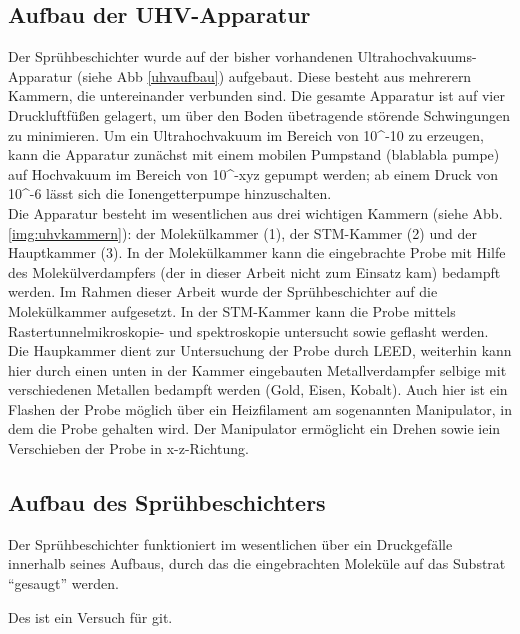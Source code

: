 \subsection{Aufbau der UHV-Apparatur}

Der Sprühbeschichter wurde auf der bisher vorhandenen Ultrahochvakuums-Apparatur (siehe Abb \ref{uhvaufbau})
aufgebaut.
Diese besteht aus mehrerern Kammern, die untereinander verbunden sind. Die gesamte Apparatur ist auf vier
Druckluftfüßen gelagert, um über den Boden übetragende störende Schwingungen zu minimieren. Um ein
Ultrahochvakuum im Bereich von 10^-10 zu erzeugen, kann die Apparatur zunächst mit einem mobilen Pumpstand 
(blablabla pumpe) auf Hochvakuum im Bereich von 10^-xyz gepumpt werden; ab einem Druck von 10^-6 lässt sich
die Ionengetterpumpe hinzuschalten.\\
Die Apparatur besteht im wesentlichen aus drei wichtigen Kammern (siehe Abb. \ref{img:uhvkammern}): der 
Molekülkammer (1), der STM-Kammer (2) und der Hauptkammer (3). In der Molekülkammer kann die eingebrachte
Probe mit Hilfe des Molekülverdampfers (der in dieser Arbeit nicht zum Einsatz kam) bedampft werden. Im Rahmen
dieser Arbeit wurde der Sprühbeschichter auf die Molekülkammer aufgesetzt. In der STM-Kammer kann die Probe
mittels Rastertunnelmikroskopie- und spektroskopie untersucht sowie geflasht werden. Die Haupkammer dient zur
Untersuchung der Probe durch LEED, weiterhin kann hier durch einen unten in der Kammer eingebauten
Metallverdampfer selbige mit verschiedenen Metallen bedampft werden (Gold, Eisen, Kobalt). Auch hier ist ein
Flashen der Probe möglich über ein Heizfilament am sogenannten Manipulator, in dem die Probe gehalten wird.
Der Manipulator ermöglicht ein Drehen sowie iein Verschieben der Probe in x-z-Richtung.\\



\subsection{Aufbau des Sprühbeschichters}

Der Sprühbeschichter funktioniert im wesentlichen über ein Druckgefälle innerhalb seines Aufbaus, durch das
die eingebrachten Moleküle auf das Substrat "`gesaugt"' werden. 

Des ist ein Versuch für git. 